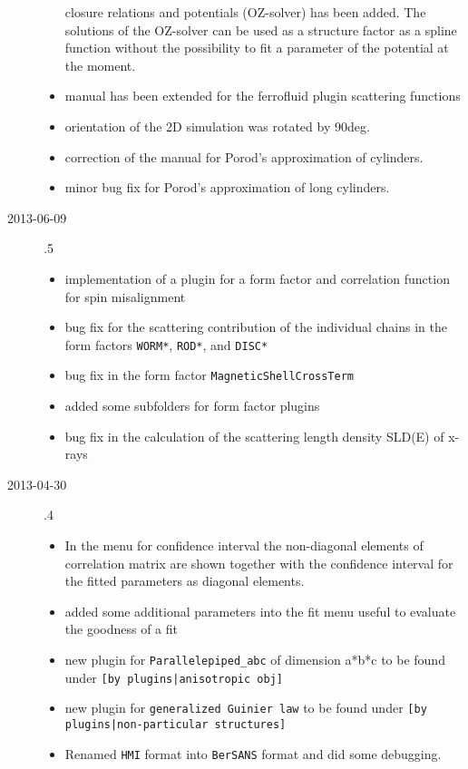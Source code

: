 \begin{description}
\begin{itemize}
            closure relations and potentials (OZ-solver) has been added. The solutions
            of the OZ-solver can be used as a structure factor as a spline function without the possibility to fit a parameter of the potential at the moment.
      \item manual has been extended for the ferrofluid plugin scattering functions
      \item orientation of the 2D simulation was rotated by 90deg.
      \item correction of the manual for Porod's approximation of cylinders.
      \item minor bug fix for Porod's approximation of long cylinders.
    \end{itemize}
    \item[2013-06-09] .5
    \begin{itemize}
      \item implementation of a plugin for a form factor and correlation function for spin misalignment
      \item  bug fix for the scattering contribution of the individual chains in the form factors \texttt{WORM*}, \texttt{ROD*}, and \texttt{DISC*}
      \item  bug fix in the form factor \texttt{MagneticShellCrossTerm}
      \item added some subfolders for form factor plugins
      \item bug fix in the calculation of the scattering length density SLD(E) of x-rays
    \end{itemize}
    \item[2013-04-30] .4
    \begin{itemize}
      \item In the menu for confidence interval the non-diagonal elements of
            correlation matrix are shown together with the confidence interval
            for the fitted parameters as diagonal elements.
      \item added some additional parameters into the fit menu useful to
            evaluate the goodness of a fit
      \item new plugin for \texttt{Parallelepiped\_abc} of dimension a*b*c to be
            found under \texttt{[by plugins|anisotropic obj]}
      \item new plugin for \texttt{generalized Guinier law} to be found under
            \texttt{[by plugins|non-particular structures]}
      \item Renamed \texttt{HMI} format into \texttt{BerSANS} format and did some debugging.

\end{itemize}
\end{description}
